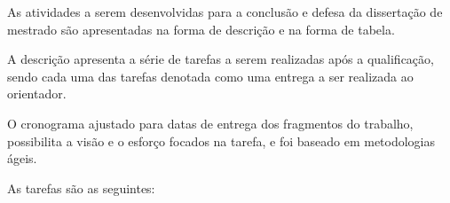 
As atividades a serem desenvolvidas para a 
conclusão e defesa da dissertação de mestrado 
são apresentadas na forma de descrição e na forma de tabela.

A descrição apresenta a série de tarefas 
a serem realizadas após a qualificação, 
sendo cada uma das tarefas denotada como uma entrega 
a ser realizada ao orientador.

O cronograma ajustado para datas de entrega dos fragmentos do trabalho,
 possibilita a visão e o esforço focados na tarefa, 
e foi baseado em metodologias ágeis.


As tarefas são as seguintes:


